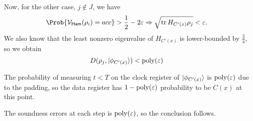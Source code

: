 \begin{prf}
	Now, for the other case, $j\notin J$, we have
	$$\Prob{\cV_\GS(\rho_i)=acc}>\frac{1}{2}-2\varepsilon\Rightarrow\sqrt{\tr H_{C'(x)}\rho_j}<\varepsilon.$$
	We also know that the least nonzero eigenvalue of $H_{C'(x)}$ is lower-bounded by $\frac{3}{4}$, so we obtain 
	$$D(\rho_j, \ket{\phi_{C'(x)}})<\operatorname*{\operatorname{poly}}(\varepsilon)$$

	The probability of measuring $t<T$ on the clock register of $\ket{\phi_{C'(x)}}$ is $\operatorname*{\operatorname{poly}}(\varepsilon)$ due to the padding,
	so the data register has $1-\operatorname*{\operatorname{poly}}(\varepsilon)$ probability to be $C(x)$ at this point.

	The soundness errors at each step is $\operatorname*{\operatorname{poly}}(\varepsilon)$, so the conclusion follows.
\end{prf}
